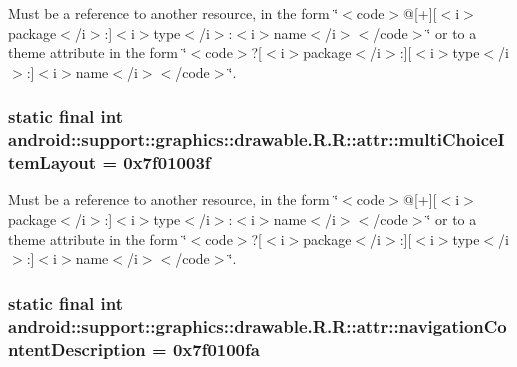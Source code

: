 Must be a reference to another resource, in the form \char`\"{}$<$code$>$@\mbox{[}+\mbox{]}\mbox{[}$<$i$>$package$<$/i$>$:\mbox{]}$<$i$>$type$<$/i$>$:$<$i$>$name$<$/i$>$$<$/code$>$\char`\"{} or to a theme attribute in the form \char`\"{}$<$code$>$?\mbox{[}$<$i$>$package$<$/i$>$:\mbox{]}\mbox{[}$<$i$>$type$<$/i$>$:\mbox{]}$<$i$>$name$<$/i$>$$<$/code$>$\char`\"{}. \hypertarget{classandroid_1_1support_1_1graphics_1_1drawable_1_1_r_1_1attr_f41326fdc5518c451b962af6f48530b4}{
\subsubsection[{multiChoiceItemLayout}]{\setlength{\rightskip}{0pt plus 5cm}static final int android::support::graphics::drawable.R.R::attr::multiChoiceItemLayout = 0x7f01003f}}
\label{classandroid_1_1support_1_1graphics_1_1drawable_1_1_r_1_1attr_f41326fdc5518c451b962af6f48530b4}


Must be a reference to another resource, in the form \char`\"{}$<$code$>$@\mbox{[}+\mbox{]}\mbox{[}$<$i$>$package$<$/i$>$:\mbox{]}$<$i$>$type$<$/i$>$:$<$i$>$name$<$/i$>$$<$/code$>$\char`\"{} or to a theme attribute in the form \char`\"{}$<$code$>$?\mbox{[}$<$i$>$package$<$/i$>$:\mbox{]}\mbox{[}$<$i$>$type$<$/i$>$:\mbox{]}$<$i$>$name$<$/i$>$$<$/code$>$\char`\"{}. \hypertarget{classandroid_1_1support_1_1graphics_1_1drawable_1_1_r_1_1attr_b82476937fd5fd3cc7df3581fe2cd334}{
\subsubsection[{navigationContentDescription}]{\setlength{\rightskip}{0pt plus 5cm}static final int android::support::graphics::drawable.R.R::attr::navigationContentDescription = 0x7f0100fa}}
\label{classandroid_1_1support_1_1graphics_1_1drawable_1_1_r_1_1attr_b82476937fd5fd3cc7df3581fe2cd334}


